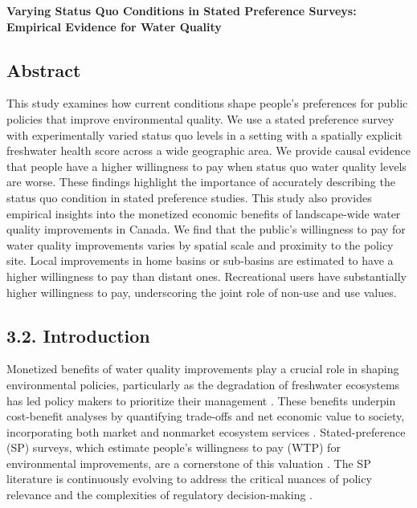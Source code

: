 \documentclass[12pt]{article}
\begin{document}
\newpage

\begin{flushleft}
\large{\textbf{Varying Status Quo Conditions in Stated Preference Surveys: Empirical Evidence for Water Quality}}
\end{flushleft}

\subsection*{Abstract}


This study examines how current conditions shape people’s preferences for public policies that improve environmental quality. 
We use a stated preference survey with experimentally varied status quo levels in a setting with a spatially explicit freshwater 
health score across a wide geographic area. We provide causal evidence that people have a higher willingness to pay when status 
quo water quality levels are worse. These findings highlight the importance of accurately describing the status quo condition 
in stated preference studies. This study also provides empirical insights into the monetized economic benefits of landscape-wide 
water quality improvements in Canada. We find that the public’s willingness to pay for water quality improvements varies by 
spatial scale and proximity to the policy site. Local improvements in home basins or sub-basins are estimated to have a higher 
willingness to pay than distant ones. Recreational users have substantially higher willingness to pay, underscoring the joint 
role of non-use and use values.


\subsection*{3.2. Introduction}

Monetized benefits of water quality improvements play a crucial role in shaping environmental policies, particularly as the degradation 
of freshwater ecosystems has led policy makers to prioritize their management \parencite{unwater2021, naidoo2005economic, keiser2019low}. 
These benefits underpin cost-benefit analyses by quantifying trade-offs and net economic value to society, incorporating 
both market and nonmarket ecosystem services \parencite{goldstein2012integrating, naidoo2005economic, arrow1996there}. 
Stated-preference (SP) surveys, which estimate people's willingness to pay (WTP) for environmental improvements, 
are a cornerstone of this valuation \parencite{johnston2017contemporary}. The SP literature is continuously evolving to address 
the critical nuances of policy relevance and the complexities of regulatory decision-making \autocite{johnston2017contemporary, vossler2023valuing, moore2023measuring,bateman2023perspectives}.
\end{document}
